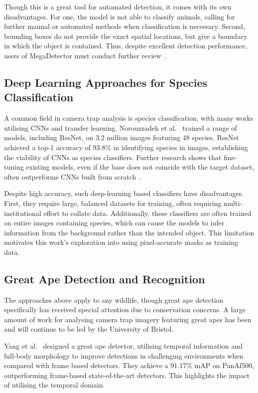 \documentclass[author={Jacob Stephenson},
    degree={BSc},
    title={Robust Great Ape Species Detection in Wild Camera Trap Imagery with Promptable Concept Segmentation},
    unit={COMS30045},
    subtitle={}]{dissertation}
\begin{document}
Though this is a great tool for automated detection, it comes with its own disadvantages. For one, the model is not able to classify animals, calling for further manual or automated methods when classification is necessary. Second, bounding boxes do not provide the exact spatial locations, but give a boundary in which the object is contained. Thus, despite excellent detection performance, users of MegaDetector must conduct further review~\cite{velez2022choosingappropriateplatformworkflow}.

\subsection{Deep Learning Approaches for Species Classification}

A common field in camera trap analysis is species classification, with many works utilising CNNs and transfer learning. Norouzzadeh et al.~\cite{norouzzadeh2017automaticallyidentifyingcountingdescribing} trained a range of models, including ResNet, on 3.2 million images featuring 48 species. ResNet achieved a top-1 accuracy of 93.8\% in identifying species in images, establishing the viability of CNNs as species classifiers. Further research shows that fine-tuning existing models, even if the base does not coincide with the target dataset, often outperforms CNNs built from scratch~\cite{willi2019identifying}.

Despite high accuracy, such deep-learning based classifiers have disadvantages. First, they require large, balanced datasets for training, often requiring multi-institutional effort to collate data. Additionally, these classifiers are often trained on entire images containing species, which can cause the models to infer information from the background rather than the intended object. This limitation motivates this work's exploration into using pixel-accurate masks as training data.


\subsection{Great Ape Detection and Recognition}

The approaches above apply to any wildlife, though great ape detection specifically has received special attention due to conservation concerns. A large amount of work for analysing camera trap imagery featuring great apes has been and will continue to be led by the University of Bristol.

Yang et al.~\cite{yang2019greatapedetectionchallenging} designed a great ape detector, utilising temporal information and full-body morphology to improve detections in challenging environments when compared with frame based detectors. They achieve a 91.17\% mAP on PanAf500, outperforming frame-based state-of-the-art detectors. This highlights the impact of utilising the temporal domain.
\end{document}
